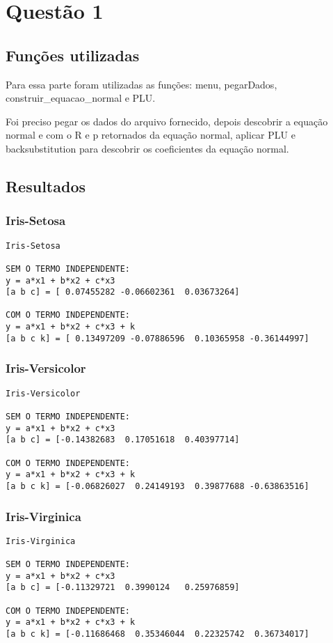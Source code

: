 \documentclass[a4paper,12pt,twoside]{article}
\begin{document}
\section{Questão 1}
\subsection{Funções utilizadas}
Para essa parte foram utilizadas as funções: menu, pegarDados, construir\_equacao\_normal e PLU.

Foi preciso pegar os dados do arquivo fornecido, depois descobrir a equação normal e com o R e p retornados da equação normal, aplicar PLU e backsubstitution para descobrir os coeficientes da equação normal.

\subsection{Resultados}
\subsubsection{Iris-Setosa}
\begin{lstlisting}
Iris-Setosa

SEM O TERMO INDEPENDENTE: 
y = a*x1 + b*x2 + c*x3
[a b c] = [ 0.07455282 -0.06602361  0.03673264]

COM O TERMO INDEPENDENTE: 
y = a*x1 + b*x2 + c*x3 + k
[a b c k] = [ 0.13497209 -0.07886596  0.10365958 -0.36144997]
\end{lstlisting}

\subsubsection{Iris-Versicolor}
\begin{lstlisting}
Iris-Versicolor

SEM O TERMO INDEPENDENTE: 
y = a*x1 + b*x2 + c*x3
[a b c] = [-0.14382683  0.17051618  0.40397714]

COM O TERMO INDEPENDENTE: 
y = a*x1 + b*x2 + c*x3 + k
[a b c k] = [-0.06826027  0.24149193  0.39877688 -0.63863516]
\end{lstlisting}

\subsubsection{Iris-Virginica}
\begin{lstlisting}
Iris-Virginica

SEM O TERMO INDEPENDENTE: 
y = a*x1 + b*x2 + c*x3
[a b c] = [-0.11329721  0.3990124   0.25976859]

COM O TERMO INDEPENDENTE: 
y = a*x1 + b*x2 + c*x3 + k
[a b c k] = [-0.11686468  0.35346044  0.22325742  0.36734017]
\end{lstlisting}
\end{document}
